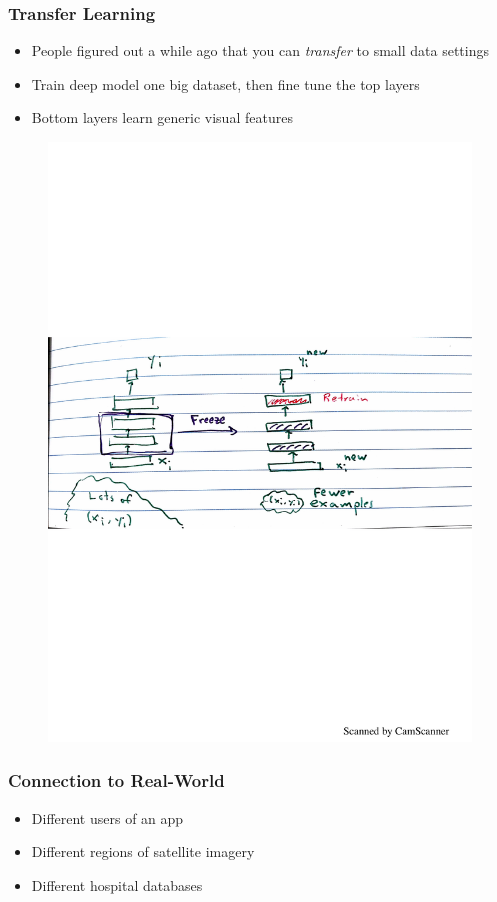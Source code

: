 \documentclass[10pt,mathserif]{beamer}
\begin{document}
\begin{frame}
  \frametitle{Transfer Learning}
  \begin{itemize}\itemsep=12pt
  \item People figured out a while ago that you can \textit{transfer} to small
    data settings
  \item Train deep model one big dataset, then fine tune the top layers
  \item Bottom layers learn generic visual features
  \end{itemize}
  \begin{figure}
    \includegraphics[width=0.6\paperwidth]{figure/transfer_drawing}
  \end{figure}
\end{frame}

\begin{frame}
  \frametitle{Connection to Real-World}
  \begin{itemize}
  \item Different users of an app
  \item Different regions of satellite imagery
  \item Different hospital databases
  \end{itemize}
\end{frame}
\end{document}
